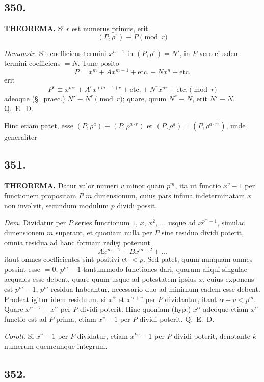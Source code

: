 \documentclass[12pt]{article}
\begin{document}
\subsection*{350.}

\textbf{THEOREMA.} Si $r$ est numerus primus, erit
\[
(P,\rho^r) \equiv P \pmod{r}
\]

\textit{Demonstr.} Sit coefficiens termini $x^{n-1}$ in $(P,\rho^r)=N'$, in $P$ vero eiusdem termini coefficiens $=N$. Tune posito
\[
P = x^m + Ax^{m-1} + \text{etc.} + Nx^n + \text{etc.}
\]
erit
\[
P^r \equiv x^{mr} + A^r x^{(m-1)r} + \text{etc.} + N^r x^{nr} + \text{etc.} \pmod{r}
\]
adeoque (\S.~praec.) $N'\equiv N^r\pmod{r}$; quare, quum $N^r\equiv N$, erit $N'\equiv N$. Q.~E.~D.

Hinc etiam patet, esse $(P,\rho^a)\equiv (P,\rho^{a\cdot r})$ et $(P,\rho^a)=(P,\rho^{a\cdot r^\nu})$, unde generaliter

\subsection*{351.}

\textbf{THEOREMA.} Datur valor numeri $v$ minor quam $p^m$, ita ut functio $x^v-1$ per functionem propositam $P$ $m$ dimensionum, cuius pars infima indeterminatam $x$ non involvit, secundum modulum $p$ dividi possit.

\textit{Dem.} Dividatur per $P$ series functionum $1$, $x$, $x^2$, $\ldots$ usque ad $x^{p^m-1}$, simulac dimensionem $m$ superant, et quoniam nulla per $P$ sine residuo dividi poterit, omnia residua ad hanc formam redigi poterunt
\[
Ax^{m-1} + Bx^{m-2} + \ldots
\]
itaut omnes coefficientes sint positivi et $<p$. Sed patet, quum nunquam omnes possint esse $=0$, $p^m-1$ tantummodo functiones dari, quarum aliqui singulae aequales esse debent, quare quum usque ad potestatem ipsius $x$, cuius exponens est $p^m-1$, $p^m$ residua habeantur, necessario duo ad minimum eadem esse debent. Prodeat igitur idem residuum, si $x^\alpha$ et $x^{\alpha+v}$ per $P$ dividantur, itaut $\alpha+v<p^m$. Quare $x^{\alpha+v}-x^\alpha$ per $P$ dividi poterit. Hinc quoniam (hyp.) $x^\alpha$ adeoque etiam $x^\alpha$ functio est ad $P$ prima, etiam $x^v-1$ per $P$ dividi poterit. Q.~E.~D.

\textit{Coroll.} Si $x^v-1$ per $P$ dividatur, etiam $x^{kv}-1$ per $P$ dividi poterit, denotante $k$ numerum quemcunque integrum.

\subsection*{352.}
\end{document}
